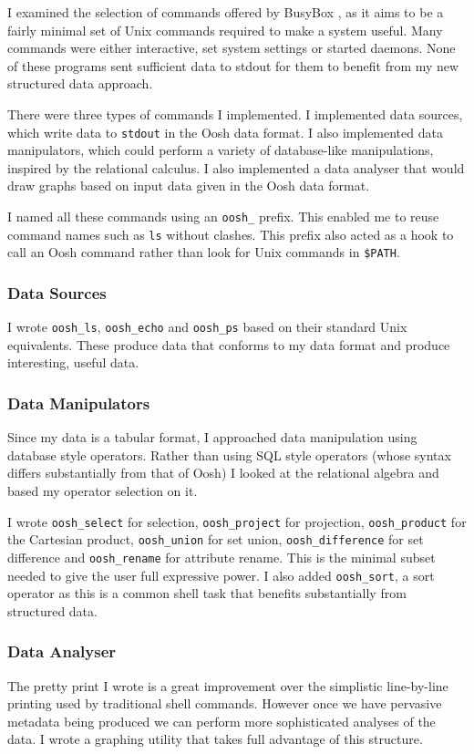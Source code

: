 \documentclass[12pt,twoside,notitlepage]{report}
\begin{document}
I examined the selection of commands offered by BusyBox
\cite{busybox}, as it aims to be a fairly minimal set of Unix commands
required to make a system useful. Many commands were either
interactive, set system settings or started daemons. None of these
programs sent sufficient data to stdout for them to benefit from my
new structured data approach.

There were three types of commands I implemented. I implemented data
sources, which write data to {\tt stdout} in the Oosh data format. I
also implemented data manipulators, which could perform a variety of
database-like manipulations, inspired by the relational calculus. I
also implemented a data analyser that would draw graphs based on input
data given in the Oosh data format.

I named all these commands using an {\tt oosh\_} prefix. This enabled me
to reuse command names such as {\tt ls} without clashes. This
prefix also acted as a hook to call an Oosh command rather than look
for Unix commands in {\tt \$PATH}.


\subsubsection{Data Sources}
I wrote {\tt oosh\_ls}, {\tt oosh\_echo} and {\tt oosh\_ps} based on their
standard Unix equivalents. These produce data that conforms to my data
format and produce interesting, useful data.

\subsubsection{Data Manipulators}
Since my data is a tabular format, I approached data manipulation
using database style operators. Rather than using SQL style operators
(whose syntax differs substantially from that of Oosh) I looked at the
relational algebra and based my operator selection on it.

I wrote {\tt oosh\_select} for selection, {\tt oosh\_project} for
projection, {\tt oosh\_product} for the Cartesian product,
{\tt oosh\_union} for set union, {\tt oosh\_difference} for set difference
and {\tt oosh\_rename} for attribute rename. This is the minimal subset
needed to give the user full expressive power. I also added
{\tt oosh\_sort}, a sort operator as this is a common shell task that
benefits substantially from structured data.

\subsubsection{Data Analyser}
The pretty print I wrote is a great improvement over the simplistic
line-by-line printing used by traditional shell commands. However once
we have pervasive metadata being produced we can perform more
sophisticated analyses of the data. I wrote a graphing utility that
takes full advantage of this structure.
\end{document}
